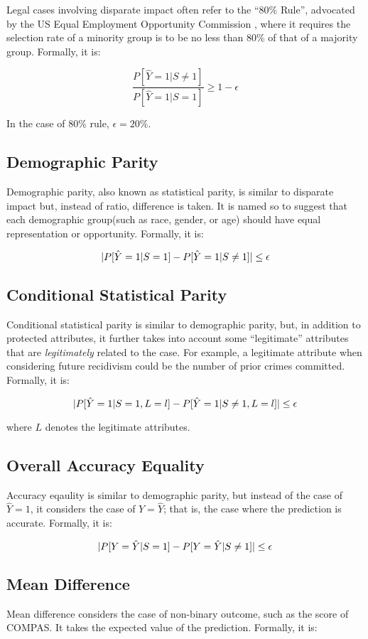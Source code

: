 \documentclass[conference]{IEEEtran}
\begin{document}
Legal cases involving disparate impact often refer to the ``80\% Rule'', advocated by the US Equal Employment Opportunity Commission \cite{eeoc1979}, where it requires the selection rate of a minority group is to be no less than 80\% of that of a majority group. Formally, it is:

\[
    \frac{P[\hat{Y} = 1 | S \neq 1]}{P[\hat{Y} = 1 | S = 1]} \geq 1 - \epsilon
\]

In the case of 80\% rule, $\epsilon = 20\%$.

\subsection{Demographic Parity}
Demographic parity, also known as statistical parity, is similar to disparate impact but, instead of ratio, difference is taken. It is named so to suggest that each demographic group(such as race, gender, or age) should have equal representation or opportunity. Formally, it is:

\[
    \lvert P[\hat{Y} = 1 | S = 1] - P[\hat{Y} = 1 | S \neq 1]\rvert \leq \epsilon
\]

\subsection{Conditional Statistical Parity}
Conditional statistical parity is similar to demographic parity, but, in addition to protected attributes, it further takes into account some ``legitimate'' attributes that are \textit{legitimately} related to the case. For example, a legitimate attribute when considering future recidivism could be the number of prior crimes committed. Formally, it is:

\[
    \lvert P[\hat{Y} = 1 | S = 1, L = l] - P[\hat{Y} = 1 | S \neq 1, L = l]\rvert \leq \epsilon
\]

where $L$ denotes the legitimate attributes.

\subsection{Overall Accuracy Equality}
Accuracy eqaulity is similar to demographic parity, but instead of the case of $\hat{Y} = 1$, it considers the case of $Y = \hat{Y}$; that is, the case where the prediction is accurate. Formally, it is:

\[
    \lvert P[Y = \hat{Y} | S = 1] - P[Y = \hat{Y} | S \neq 1]\rvert \leq \epsilon
\]

\subsection{Mean Difference}
Mean difference considers the case of non-binary outcome, such as the score of COMPAS. It takes the expected value of the prediction. Formally, it is:
\end{document}
